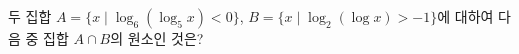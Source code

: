 두 집합 $A=\{x \mid \log_6(\log_5 x)<0\}$, $B=\{x \mid \log_2(\log x)>-1\}$에 대하여 다음 중 집합 $A\cap B$의 원소인 것은?
